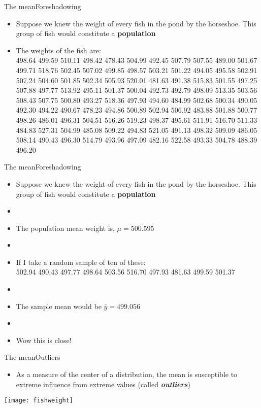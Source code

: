 \documentclass[xcolor=dvipsnames]{beamer}
\begin{document}
\begin{frame}{The mean}{Foreshadowing}
	\begin{itemize}
		\item Suppose we knew the weight of every fish in the pond by the horseshoe. This group of fish would constitute a \textbf{population}
		\item The weights of the fish are: \\
 498.64 499.59 510.11 498.42 478.43 504.99 492.45 507.79 507.55 489.00 501.67 499.71 518.76 502.45 507.02 499.85
498.57 503.21 501.22 494.05 495.58 502.91 507.24 504.60 501.85 502.34 505.93 520.01 481.63 491.38 515.83 501.55
 497.25 507.88 497.77 513.92 495.11 501.37 500.04 492.73 492.79 498.09 513.35 503.56 508.43 507.75 500.80 493.27
518.36 497.93 494.60 484.99 502.68 500.34 490.05 492.30 494.22 490.67 478.23 494.86 500.89 502.94 506.92 483.88
501.88 500.77 498.26 486.01 496.31 504.51 516.26 519.23 498.37 495.61 511.91 516.70 511.33 484.83 527.31 504.99
 485.08 509.22 494.83 521.05 491.13 498.32 509.09 486.05 508.14 490.43 496.30 514.79 493.96 497.09 482.16 522.58
 493.33 504.78 488.39 496.20
	\end{itemize}
\end{frame}

\begin{frame}{The mean}{Foreshadowing}
	\begin{itemize}
		\item Suppose we knew the weight of every fish in the pond by the horseshoe. This group of fish would constitute a \textbf{population}
		\item[]
		\item The population mean weight is, $\mu = 500.595$
		\item[]
		\item If I take a random sample of ten of these: \\
		502.94 490.43 497.77 498.64 503.56 516.70 497.93 481.63 499.59 501.37
		\item[]
		\item The sample mean would be $\bar{y} = 499.056$
		\item[]
		\item Wow this is close!
	\end{itemize}
\end{frame}

\begin{frame}{The mean}{Outliers}
\begin{itemize}
	\item As a measure of the center of a distribution, the mean is susceptible to extreme influence from extreme values (called \textbf{\emph{outliers}})
\end{itemize}
\begin{center}
	\texttt{[image: fishweight]}
\end{center}
\end{frame}
\end{document}
